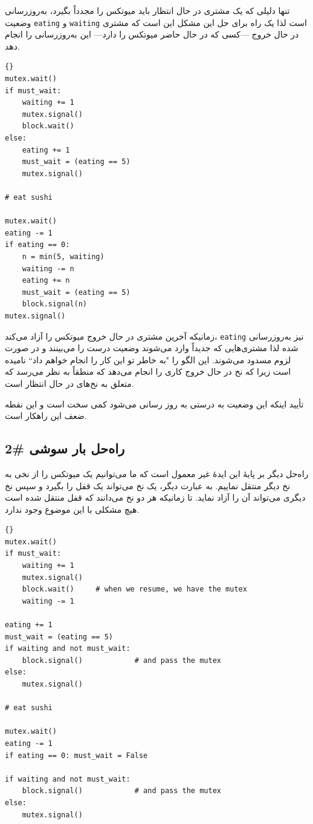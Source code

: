 \documentclass{book}
\newcommand{\clearemptydoublepage}{}%
\begin{document}
    تنها دلیلی که یک مشتری در حال انتظار باید میوتکس را مجدداً بگیرد، به‌روزرسانی وضعیت  {\tt eating} و {\tt waiting} است لذا 
    یک راه برای حل این مشکل این است که مشتری  در حال خروج ---کسی که در حال حاضر میوتکس را دارد--- این به‌روزرسانی را انجام دهد. 

\begin{latin}
\begin{lstlisting}[title=\rl{راه‌حل بار سوشی  \#1}]{}
mutex.wait()
if must_wait:
    waiting += 1
    mutex.signal()
    block.wait()
else:
    eating += 1
    must_wait = (eating == 5)
    mutex.signal()

# eat sushi

mutex.wait()
eating -= 1
if eating == 0:
    n = min(5, waiting)
    waiting -= n
    eating += n
    must_wait = (eating == 5)
    block.signal(n)
mutex.signal()
\end{lstlisting}
\end{latin}

    زمانیکه آخرین مشتری در حال خروج میوتکس را آزاد می‌کند، {\tt eating} نیز به‌روزرسانی شده لذا مشتری‌هایی که جدیداً وارد می‌شوند وضعیت درست 
    را می‌بینند و در صورت لزوم مسدود می‌شوند.  این الگو را ‍‍"به خاطر تو این کار را انجام خواهم داد`` 
    نامیده است زیرا که نخ در حال خروج کاری را انجام می‌دهد که منطقاً به نظر می‌رسد که متعلق به نخ‌های در حال انتظار است. 

    تأیید اینکه این وضعیت به درستی به روز رسانی می‌شود کمی سخت است و این نقطه ضعف این راهکار است. 


\clearemptydoublepage
\subsection{راه‌حل بار سوشی  \#2}

     راه‌حل دیگر  بر پایهٔ این ایدهٔ غیر معمول است که ما می‌توانیم یک میوتکس را از نخی به نخ دیگر منتقل نماییم. 
     به عبارت دیگر، یک نخ می‌تواند یک قفل را بگیرد و سپس نخ دیگری می‌تواند آن را آزاد نماید. تا زمانیکه هر دو نخ می‌دانند که قفل منتقل شده است 
     هیچ مشکلی با این موضوع وجود ندارد. 

\begin{latin}
\begin{lstlisting}[title=\rl{راه‌حل بار سوشی  \#2}]{}
mutex.wait()
if must_wait:
    waiting += 1
    mutex.signal()
    block.wait()     # when we resume, we have the mutex
    waiting -= 1

eating += 1
must_wait = (eating == 5)
if waiting and not must_wait:
    block.signal()            # and pass the mutex
else:
    mutex.signal()

# eat sushi

mutex.wait()
eating -= 1
if eating == 0: must_wait = False

if waiting and not must_wait:
    block.signal()            # and pass the mutex
else:
    mutex.signal()
\end{lstlisting}
\end{latin}
\end{document}

